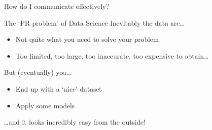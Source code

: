 \begin{frame}{How do I communicate effectively?}
\end{frame}

\begin{frame}{The `PR problem' of Data Science}
    Inevitably the data are\ldots\vspace{-1ex}
    \begin{itemize}
        \item Not quite what you need to solve your problem
        \item Too limited, too large, too inaccurate, too expensive to
              obtain\ldots
    \end{itemize}
    \vfill
    But (eventually) you\ldots\vspace{-1ex}
    \begin{itemize}
        \item End up with a `nice' dataset
        \item Apply some models
    \end{itemize}
    \vspace{-1ex}
    \ldots and it \alert{looks} incredibly easy from the outside!
\end{frame}

